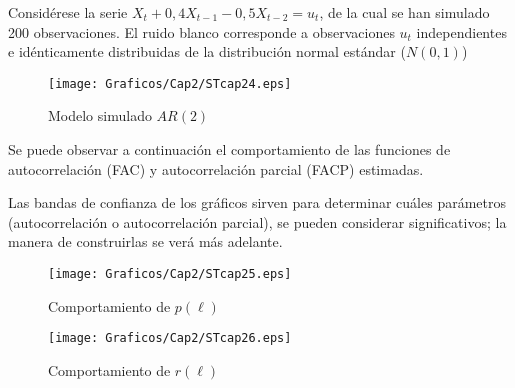 \begin{ejemplo} Consid\'{e}rese la serie $X_{t}+0,4X_{t-1}-0,5X_{t-2}=u_{t}$, de la cual se han simulado 200 observaciones. El ruido blanco corresponde a observaciones $u_{t}$ independientes e id\'{e}nticamente distribuidas de la distribuci\'{o}n normal est\'{a}ndar ($N(0,1)$)

\begin{figure}[H]
\centering
\texttt{[image: Graficos/Cap2/STcap24.eps]}
\caption{Modelo simulado $AR(2)$}
\end{figure}

Se puede observar a continuaci\'{o}n el comportamiento de las funciones de autocorrelaci\'{o}n (FAC) y autocorrelaci\'{o}n parcial (FACP) estimadas.

Las bandas de confianza de los gr\'{a}ficos sirven para determinar cu\'{a}les par\'{a}metros (autocorrelaci\'{o}n o autocorrelaci\'{o}n parcial), se pueden considerar significativos; la manera de construirlas se ver\'{a} m\'{a}s adelante.

\begin{figure}[H]
\centering
\texttt{[image: Graficos/Cap2/STcap25.eps]}
\caption{Comportamiento de $p(\ell)$}
\end{figure}

\begin{figure}[H]
\centering
\texttt{[image: Graficos/Cap2/STcap26.eps]}
\caption{Comportamiento de $r(\ell)$}
\end{figure}

\end{ejemplo}


